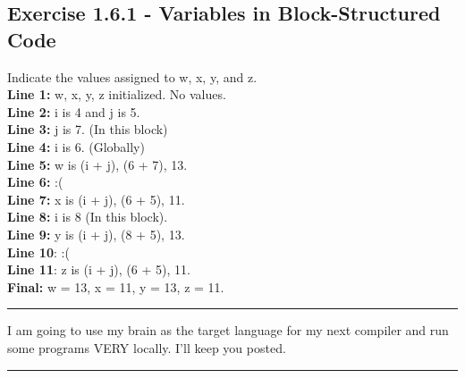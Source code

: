 \documentclass[letterpaper, 10pt]{article}
\begin{document}
\subsection{Exercise 1.6.1 - Variables in Block-Structured Code}

Indicate the values assigned to w, x, y, and z. \\
\newline
\textbf{Line 1:} w, x, y, z initialized. No values. \\
\textbf{Line 2:} i is 4 and j is 5. \\
\textbf{Line 3:} j is 7. (In this block) \\
\textbf{Line 4:} i is 6. (Globally) \\
\textbf{Line 5:} w is (i + j), (6 + 7), 13. \\
\textbf{Line 6:} :( \\
\textbf{Line 7:} x is (i + j), (6 + 5), 11. \\
\textbf{Line 8:} i is 8 (In this block). \\
\textbf{Line 9:} y is (i + j), (8 + 5), 13. \\
\textbf{Line 10}: :( \\
\textbf{Line 11}: z is (i + j), (6 + 5), 11. \\

\textbf{Final:} w = 13, x = 11, y = 13, z = 11. \\

\hrule
\vspace{.25cm}
I am going to use my brain as the target language for my next compiler and run some programs VERY locally. I'll keep you posted.
\vspace{.25cm}
\hrule
\end{document}
